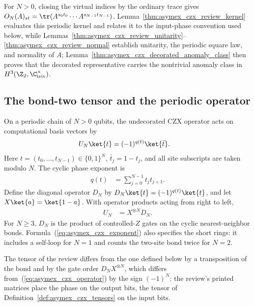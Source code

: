 For $N>0$, closing the virtual indices by the ordinary trace gives
$O_N(A)_{st}=\tr(A^{s_0t_0}\cdots A^{s_{N-1}t_{N-1}})$.
Lemma~\ref{thm:asymex_czx_review_kernel} evaluates this periodic
kernel and relates it to the input-phase convention used below, while
Lemmas~\ref{thm:asymex_czx_review_unitarity}--\ref{thm:asymex_czx_review_normal}
establish unitarity, the periodic square law, and normality of $A$;
Lemma~\ref{thm:asymex_czx_decorated_anomaly_class} then proves that
the decorated representative carries the nontrivial anomaly class in
$H^3(\Z_2,\C^\times_{\mathrm{triv}})$.

\subsection{The bond-two tensor and the periodic operator}

On a periodic chain of $N>0$ qubits, the undecorated CZX operator acts on
computational basis vectors by
\begin{align}
    U_N\ket{t} & =(-1)^{q(t)}\ket{\bar t}.
    \label{eq:asymex_czx_basis}
\end{align}
Here $t=(t_0,\ldots,t_{N-1})\in\{0,1\}^N$, $\bar t_j=1-t_j$, and
all site subscripts are taken modulo $N$. The cyclic phase exponent is
\begin{align}
    q(t) & =\sum_{j=0}^{N-1}t_jt_{j+1}.
    \label{eq:asymex_czx_exponent}
\end{align}
Define the diagonal operator $D_N$ by
$D_N\ket{t}=(-1)^{q(t)}\ket{t}$, and let $X\ket{a}=\ket{1-a}$.
With operator products acting from right to left,
\begin{align}
    U_N & =X^{\otimes N}D_N.
    \label{eq:asymex_czx_operator}
\end{align}
For $N\geq3$, $D_N$ is the product of controlled-$Z$ gates on the
cyclic nearest-neighbor bonds. Formula~(\ref{eq:asymex_czx_exponent})
also specifies the short rings: it includes a self-loop for $N=1$ and
counts the two-site bond twice for $N=2$.

The tensor of the review differs from the one defined below by a
transposition of the bond and by the gate order $D_NX^{\otimes N}$, which
differs from~(\ref{eq:asymex_czx_operator}) by the sign $(-1)^N$: the
review's printed matrices place the phase on the output bits, the tensor of
Definition~\ref{def:asymex_czx_tensors} on the input bits.

